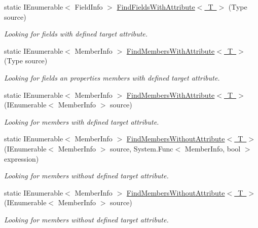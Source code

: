 \begin{DoxyCompactItemize}
\item 
static I\+Enumerable$<$ Field\+Info $>$ \mbox{\hyperlink{class_uniform_data_operator_1_1_assemblies_management_1_1_members_handler_a563f793ce990d95b0830a3dff609a9ee}{Find\+Fields\+With\+Attribute$<$ T $>$}} (Type source)
\begin{DoxyCompactList}\small\item\em Looking for fields with defined target attribute. \end{DoxyCompactList}\item 
static I\+Enumerable$<$ Member\+Info $>$ \mbox{\hyperlink{class_uniform_data_operator_1_1_assemblies_management_1_1_members_handler_abf58fa664b9202a0776cbb9a1c659ba9}{Find\+Members\+With\+Attribute$<$ T $>$}} (Type source)
\begin{DoxyCompactList}\small\item\em Looking for fields an properties members with defined target attribute. \end{DoxyCompactList}\item 
static I\+Enumerable$<$ Member\+Info $>$ \mbox{\hyperlink{class_uniform_data_operator_1_1_assemblies_management_1_1_members_handler_ad5add0d63eb8e0f8dac0e48be98032ae}{Find\+Members\+With\+Attribute$<$ T $>$}} (I\+Enumerable$<$ Member\+Info $>$ source)
\begin{DoxyCompactList}\small\item\em Looking for members with defined target attribute. \end{DoxyCompactList}\item 
static I\+Enumerable$<$ Member\+Info $>$ \mbox{\hyperlink{class_uniform_data_operator_1_1_assemblies_management_1_1_members_handler_a1c637a7411bf34126f5ab90b130a3f04}{Find\+Members\+Without\+Attribute$<$ T $>$}} (I\+Enumerable$<$ Member\+Info $>$ source, System.\+Func$<$ Member\+Info, bool $>$ expression)
\begin{DoxyCompactList}\small\item\em Looking for members without defined target attribute. \end{DoxyCompactList}\item 
static I\+Enumerable$<$ Member\+Info $>$ \mbox{\hyperlink{class_uniform_data_operator_1_1_assemblies_management_1_1_members_handler_a5c40c81b34d93d301c5f0d421dadc39a}{Find\+Members\+Without\+Attribute$<$ T $>$}} (I\+Enumerable$<$ Member\+Info $>$ source)
\begin{DoxyCompactList}\small\item\em Looking for members without defined target attribute. \end{DoxyCompactList}\item 

\end{DoxyCompactItemize}
